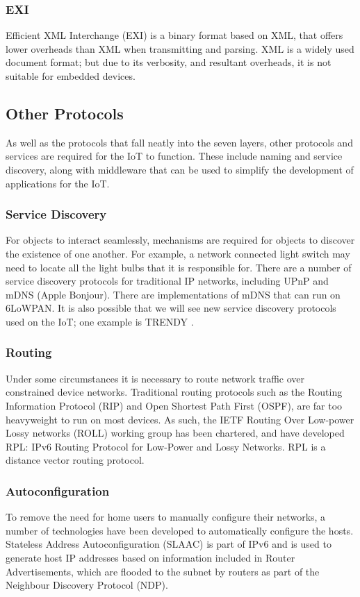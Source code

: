 \documentclass[10pt,journal,compsoc]{IEEEtran}
\begin{document}
\subsubsection{EXI}
Efficient XML Interchange (EXI) is a binary format based on XML, that offers
lower overheads than XML when transmitting and parsing. XML is a widely used
document format; but due to its verbosity, and resultant overheads, it is not
suitable for embedded devices. 

\subsection{Other Protocols} As well as the protocols that fall neatly into the
seven layers, other protocols and services are required for the IoT to
function. These include naming and service discovery, along with middleware
that can be used to simplify the development of applications for the IoT.

\subsubsection{Service Discovery}
For objects to interact seamlessly, mechanisms are required for objects to
discover the existence of one another. For example, a network connected light
switch may need to locate all the light bulbs that it is responsible for. There
are a number of service discovery protocols for traditional IP networks,
including UPnP and mDNS (Apple Bonjour). There are implementations of mDNS
that can run on 6LoWPAN. It is also possible that we will see new service
discovery protocols used on the IoT; one example is TRENDY \cite{Butt2013}. 

\subsubsection{Routing}
Under some circumstances it is necessary to route network traffic over
constrained device networks. Traditional routing protocols such as the Routing
Information Protocol (RIP) and Open Shortest Path First (OSPF), are far too
heavyweight to run on most devices. As such, the IETF Routing Over Low-power
Lossy networks (ROLL) working group has been chartered, and have developed RPL:
IPv6 Routing Protocol for Low-Power and Lossy Networks. RPL is a distance
vector routing protocol.   

\subsubsection{Autoconfiguration}
To remove the need for home users to manually configure their networks, a number of
technologies have been developed to automatically configure the hosts.
Stateless Address Autoconfiguration (SLAAC) is part of IPv6 and is used to
generate host IP addresses based on information included in Router
Advertisements, which are flooded to the subnet by routers as part of the
Neighbour Discovery Protocol (NDP). 
\end{document}
